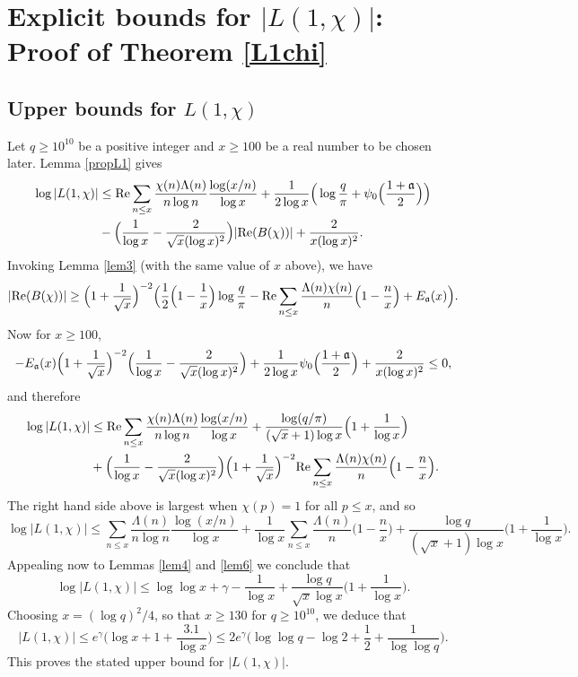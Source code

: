 \documentclass [12pt]{amsart}
\numberwithin{equation}{section}
\newcommand{\tRe}{\textup{Re}}
\begin{document}
 
\section{Explicit bounds for $|L(1,\chi)|$: Proof of Theorem \ref{L1chi}}


\subsection{Upper bounds for $L(1,\chi)$}
Let $q\geq 10^{10}$ be a positive integer and $x\geq 100$ be a real number to be chosen later.   Lemma \ref{propL1} gives\begin{align*} 
\log |L(1,\chi)|&\le \tRe \sum_{n\le x} \frac{\chi(n)\Lambda(n)}{n\log n} \frac{\log (x/n)}{\log x} 
+ \frac{1}{2\log x} \Big(\log \frac q\pi + \psi_0\Big(\frac{1+\frak a}{2}\Big) \Big) 
\\ 
&- \Big(\frac{1}{\log x} -\frac{2}{\sqrt{x}(\log x)^2}\Big) |\tRe (B(\chi))| + \frac{2}{x(\log x)^2}. 
\end{align*}
Invoking Lemma \ref{lem3} (with the same value of $x$ above), we have 
$$ 
|\tRe (B(\chi))| \ge \Big(1+\frac {1}{\sqrt{x}}\Big)^{-2} \Big( \frac 12 \Big(1-\frac 1x\Big) 
\log \frac{q}{\pi} -\tRe  \sum_{n\le x} \frac{\Lambda(n)\chi(n)}{n} \Big(1-\frac nx\Big) + E_{\frak a}(x)\Big). 
$$ 
Now for $x\ge 100$, 
$$ 
-E_{\frak a}(x) \Big(1+\frac1{\sqrt{x}}\Big)^{-2} \Big(\frac{1}{\log x} -\frac{2}{\sqrt{x}(\log x)^2} 
\Big) + \frac{1}{2\log x} \psi_0 \Big(\frac{1+\frak a}{2}\Big) + \frac{2}{x(\log x)^2} \le 0, 
$$ 
and therefore 
\begin{align*} 
\log |L(1,\chi)|
 &\le \tRe \sum_{n\le x} \frac{\chi(n)\Lambda(n)}{n\log n} \frac{\log (x/n)}{\log x} 
+ \frac{\log (q/\pi)}{(\sqrt{x}+1)\log x} \Big(1+\frac{1}{\log x} \Big) \\
&+ \Big(\frac{1}{\log x} -\frac{2}{\sqrt{x}(\log x)^2} \Big) 
\Big(1+\frac 1{\sqrt{x}}\Big)^{-2} \tRe \sum_{n\le x} \frac{\Lambda(n)\chi(n)}{n} 
\Big(1-\frac{n}{x}\Big).
\end{align*}
The right hand side above is largest when $\chi(p)=1$ for all $p\le x$, and so 
\begin{equation*} 
\label{5.1} 
\log |L(1,\chi)| \le \sum_{n\le x} \frac{\Lambda(n)}{n\log n} \frac{\log (x/n)}{\log x} 
+\frac{1}{\log x} \sum_{n\le x} \frac{\Lambda(n)}{n} \Big(1-\frac{n}{x}\Big) 
+ \frac{\log q}{(\sqrt{x}+1)\log x}\Big(1+\frac{1}{\log x}\Big). 
\end{equation*}
Appealing now to Lemmas \ref{lem4} and \ref{lem6} we conclude that 
$$ 
\log |L(1,\chi)| \le \log \log x +\gamma -\frac{1}{\log x} + \frac{\log q}{\sqrt{x} \log x}\Big(1+\frac{1}{\log x}\Big).
$$ 
Choosing $x= (\log q)^2/4$, so that $x\ge 130$ for $q \ge 10^{10}$, we deduce that 
$$ 
|L(1,\chi)| \le e^{\gamma} \Big(\log x +1 + \frac{3.1}{\log x} \Big) 
\le 2e^{\gamma} \Big( \log \log q -\log 2 +\frac 12 + \frac{1}{\log \log q}\Big).
$$ 
This proves the stated upper bound for $|L(1,\chi)|$.  
\end{document}
